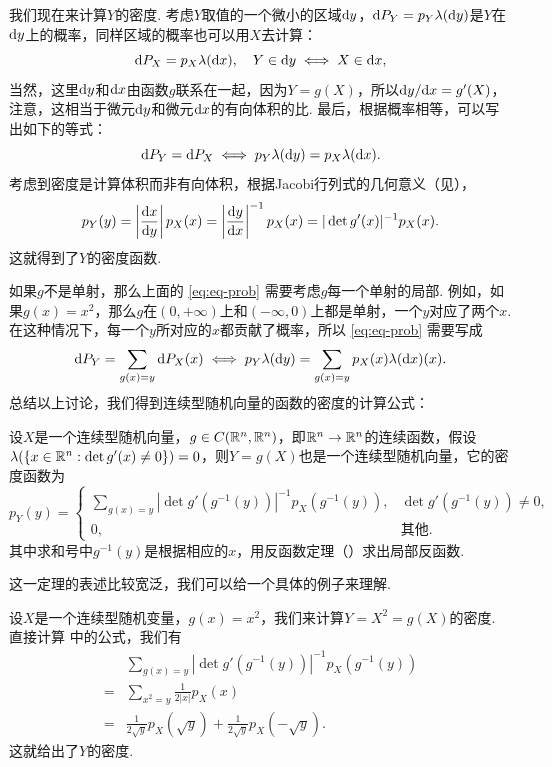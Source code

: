 我们现在来计算$Y$的密度. 考虑$Y$取值的一个微小的区域$\mathrm{d} y$，$\mathrm{d} P_Y=p_Y\lambda(\mathrm{d} y)$是$Y$在$\mathrm{d} y$上的概率，同样区域的概率也可以用$X$去计算：
\[\mathrm{d} P_X=p_X\lambda(\mathrm{d} x),\quad Y\in\mathrm{d} y\iff X\in\mathrm{d} x,\]
当然，这里$\mathrm{d} y$和$\mathrm{d} x$由函数$g$联系在一起，因为$Y=g(X)$，所以$\mathrm{d} y/\mathrm{d} x=g'(X)$，注意，这相当于微元$\mathrm{d} y$和微元$\mathrm{d} x$的有向体积的比. 最后，根据概率相等，可以写出如下的等式：
\begin{equation}
    \mathrm{d} P_Y=\mathrm{d} P_X\iff p_Y\lambda(\mathrm{d} y)=p_X\lambda(\mathrm{d} x).\label{eq:eq-prob}
\end{equation}
考虑到密度是计算体积而非有向体积，根据Jacobi行列式的几何意义（见），
\[p_Y(y)=\left|\frac{\mathrm{d} x}{\mathrm{d} y}\right|p_X(x)=\left|\frac{\mathrm{d} y}{\mathrm{d} x}\right|^{-1}p_X(x)=|\det g'(x)|^{-1}p_X(x).\]
这就得到了$Y$的密度函数. 

如果$g$不是单射，那么上面的 \eqref{eq:eq-prob} 需要考虑$g$每一个单射的局部. 例如，如果$g(x)=x^2$，那么$g$在$(0,+\infty)$上和$(-\infty,0)$上都是单射，一个$y$对应了两个$x$. 在这种情况下，每一个$y$所对应的$x$都贡献了概率，所以 \eqref{eq:eq-prob} 需要写成
\begin{equation}
    \mathrm{d} P_Y=\sum_{g(x)=y}\mathrm{d} P_X(x)\iff p_Y\lambda(\mathrm{d} y)=\sum_{g(x)=y}p_X(x)\lambda(\mathrm{d} x)(x).\label{eq:eq-prob-2}
\end{equation}
总结以上讨论，我们得到连续型随机向量的函数的密度的计算公式：

\begin{theorem}\label{theorem:continuous-function}
设$X$是一个连续型随机向量，$g\in C(\mathbb{R}^n,\mathbb{R}^n)$，即$\mathbb{R}^n\to\mathbb{R}^n$的连续函数，假设$\lambda(\{x\in\mathbb{R}^n:\det g'(x)\neq 0\})=0$，则$Y=g(X)$也是一个连续型随机向量，它的密度函数为
\[p_Y(y)=\begin{cases}
    \displaystyle\sum_{g(x)=y}|\det g'(g^{-1}(y))|^{-1}p_X(g^{-1}(y)),&\det g'(g^{-1}(y))\neq 0,\\
    0,&\text{其他}.
\end{cases}\]
其中求和号中$g^{-1}(y)$是根据相应的$x$，用反函数定理（）求出局部反函数. 
\end{theorem}

这一定理的表述比较宽泛，我们可以给一个具体的例子来理解. 

\begin{example}
设$X$是一个连续型随机变量，$g(x)=x^2$，我们来计算$Y=X^2=g(X)$的密度. 直接计算 中的公式，我们有
\begin{align*}
    &\sum_{g(x)=y}|\det g'(g^{-1}(y))|^{-1}p_X(g^{-1}(y))\\
    =&\sum_{x^2=y}\frac{1}{2|x|}p_X(x)\\
    =&\frac{1}{2\sqrt{y}}p_X(\sqrt{y})+\frac{1}{2\sqrt{y}}p_X(-\sqrt{y}).
\end{align*}
这就给出了$Y$的密度. 
\end{example}

